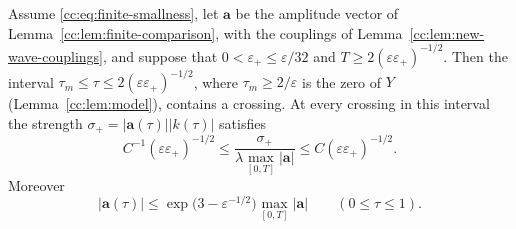 \begin{proposition}\label{cc:prop:finite-return}
Assume \eqref{cc:eq:finite-smallness}, let $\mathbf a$ be the amplitude
vector of Lemma~\ref{cc:lem:finite-comparison}, with the couplings of
Lemma~\ref{cc:lem:new-wave-couplings}, and suppose that
$0<\varepsilon_+\le\varepsilon/32$ and
$T\ge2(\varepsilon\varepsilon_+)^{-1/2}$. Then the interval
$\tau_m\le\tau\le2(\varepsilon\varepsilon_+)^{-1/2}$, where
$\tau_m\ge2/\varepsilon$ is the zero of $Y$
(Lemma~\ref{cc:lem:model}), contains a crossing. At every crossing in
this interval the strength $\sigma_+=|\mathbf a(\tau)||k(\tau)|$ satisfies
\begin{equation}\label{cc:eq:general-return}
 C^{-1}(\varepsilon\varepsilon_+)^{-1/2}
 \le\frac{\sigma_+}{\lambda\max_{[0,T]}|\mathbf a|}
 \le C(\varepsilon\varepsilon_+)^{-1/2}.
\end{equation}
Moreover
\begin{equation}\label{cc:eq:gain}
 |\mathbf a(\tau)|\le\exp\bigl(3-\varepsilon^{-1/2}\bigr)
 \max_{[0,T]}|\mathbf a|\qquad(0\le\tau\le1).
\end{equation}
\end{proposition}
